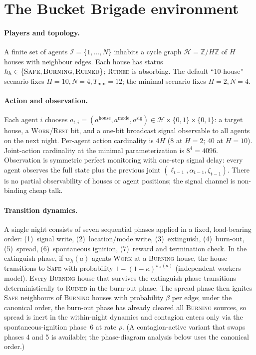 \documentclass{anvil-paper}
\begin{document}
\section{The Bucket Brigade environment}
\label{sec:env}

\paragraph{Players and topology.}
A finite set of agents $\mathcal{I}{=}\{1,\ldots,N\}$ inhabits a cycle graph
$\mathcal{H}{=}\mathbb{Z}/H\mathbb{Z}$ of $H$ houses with neighbour edges. Each
house has status $h_h\in\{\textsc{Safe},\textsc{Burning},\textsc{Ruined}\}$;
\textsc{Ruined} is absorbing. The default ``10-house'' scenario fixes
$H{=}10,N{=}4,T_{\min}{=}12$; the minimal scenario fixes $H{=}2,N{=}4$.

\paragraph{Action and observation.}
Each agent $i$ chooses
$a_{t,i}{=}(a^{\text{house}},a^{\text{mode}},a^{\text{sig}})\in
\mathcal{H}\times\{0,1\}\times\{0,1\}$: a target house, a
\textsc{Work}/\textsc{Rest} bit, and a one-bit broadcast signal observable to
all agents on the next night. Per-agent action cardinality is $4H$ ($8$ at
$H{=}2$; $40$ at $H{=}10$). Joint-action cardinality at the minimal
parameterization is $8^4{=}4096$. Observation is symmetric perfect monitoring
with one-step signal delay: every agent observes the full state plus the
previous joint $(\ell_{t-1},\alpha_{t-1},\zeta_{t-1})$. There is no partial
observability of houses or agent positions; the signal channel is
non-binding cheap talk.

\paragraph{Transition dynamics.}
A single night consists of seven sequential phases applied in a fixed,
load-bearing order: (1)~signal write, (2)~location/mode write,
(3)~extinguish, (4)~burn-out, (5)~spread, (6)~spontaneous ignition,
(7)~reward and termination check. In the extinguish phase, if $w_h(a)$
agents \textsc{Work} at a \textsc{Burning} house, the house transitions to
\textsc{Safe} with probability $1-(1-\kappa)^{w_h(a)}$ (independent-workers
model). Every \textsc{Burning} house that survives the extinguish phase
transitions deterministically to \textsc{Ruined} in the burn-out phase. The
spread phase then ignites \textsc{Safe} neighbours of \textsc{Burning}
houses with probability $\beta$ per edge; under the canonical order, the
burn-out phase has already cleared all \textsc{Burning} sources, so spread is
inert in the within-night dynamics and contagion enters only via the
spontaneous-ignition phase~6 at rate $\rho$. (A contagion-active variant
that swaps phases 4 and 5 is available; the phase-diagram analysis below
uses the canonical order.)
\end{document}
